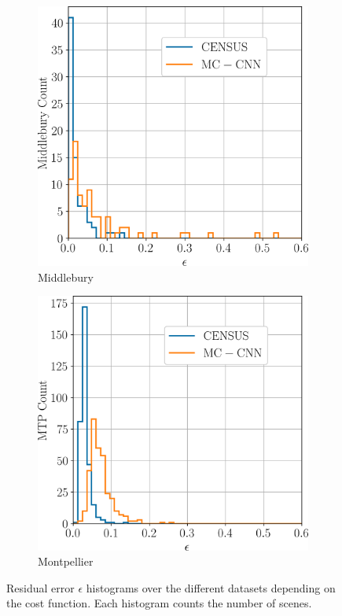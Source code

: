 \begin{figure}
    \centering
    \begin{subfigure}[t]{0.5\linewidth}
        \centering
        \includegraphics[width=\linewidth]{Images/Chap_5/histogram_eps_middlebury.png}
        \caption{Middlebury}
        \label{fig:eps_middlebury}
    \end{subfigure}\hfill
    \begin{subfigure}[t]{0.5\linewidth}
        \centering
        \includegraphics[width=\linewidth]{Images/Chap_5/histogram_eps_mtp.png}
        \caption{Montpellier}
        \label{fig:eps_mtp}
    \end{subfigure}
    \caption{Residual error $\epsilon$ histograms over the different datasets depending on the cost function. Each histogram counts the number of scenes.}
    \label{fig:eps_hist}
\end{figure}


